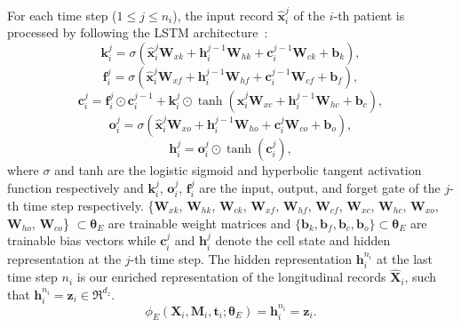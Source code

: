 For each time step ($1 \leq j \leq n_i$), the input record $\hat{\mathbf{x}}_i^j$ of the $i$-th patient is processed by following the LSTM architecture~\cite{yu2019review}:
\begin{equation}
    \mathbf{k}^j_i = \sigma(\hat{\mathbf{x}}^j_i \mathbf{W}_{xk} + \mathbf{h}_i^{j-1} \mathbf{W}_{hk} + \mathbf{c}_i^{j-1} \mathbf{W}_{ck} + \mathbf{b}_k),
\end{equation}
\begin{equation}
    \mathbf{f}^j_i = \sigma(\hat{\mathbf{x}}^j_i \mathbf{W}_{xf} + \mathbf{h}^{j-1}_i \mathbf{W}_{hf} + \mathbf{c}^{j-1}_i \mathbf{W}_{cf} + \mathbf{b}_f),
\end{equation}
\begin{equation}\label{eq: cell state}
    \mathbf{c}^j_i = \mathbf{f}^j_i \odot \mathbf{c}^{j-1}_i + \mathbf{k}^j_i \odot \operatorname{tanh}(\hat{\mathbf{x}}_i^j \mathbf{W}_{xc} + \mathbf{h}^{j - 1}_i \mathbf{W}_{hc} + \mathbf{b}_c),
\end{equation}
\begin{equation}
    \mathbf{o}^j_i = \sigma(\hat{\mathbf{x}}_i^j \mathbf{W}_{xo} + \mathbf{h}^{j-1}_i \mathbf{W}_{ho} + \mathbf{c}^j_i \mathbf{W}_{co} + \mathbf{b}_o),
\end{equation}
\begin{equation}
    \mathbf{h}^j_i = \mathbf{o}^j_i \odot \operatorname{tanh}(\mathbf{c}^j_i),
\end{equation}
where $\sigma$ and tanh are the logistic sigmoid and hyperbolic tangent activation function respectively and $\mathbf{k}^j_i$, $\mathbf{o}^j_i$, $\mathbf{f}^j_i$ are the input, output, and forget gate of the $j$-th time step respectively. \{$\mathbf{W}_{xk}$, $\mathbf{W}_{hk}$, $\mathbf{W}_{ck}$, $\mathbf{W}_{xf}$, $\mathbf{W}_{hf}$, $\mathbf{W}_{cf}$, $\mathbf{W}_{xc}$, $\mathbf{W}_{hc}$, $\mathbf{W}_{xo}$, $\mathbf{W}_{ho}$, $\mathbf{W}_{co}$\} $\subset \mathbf{\theta}_E$ are trainable weight matrices and $\{\mathbf{b}_k, \mathbf{b}_f, \mathbf{b}_c, \mathbf{b}_o\} \subset \mathbf{\theta}_E$ are trainable bias vectors while $\mathbf{c}_i^j$ and $\mathbf{h}_i^j$ denote the cell state and hidden representation at the $j$-th time step. The hidden representation $\mathbf{h}_i^{n_i}$ at the last time step $n_i$ is our enriched representation of the longitudinal records $\hat{\mathbf{X}}_i$, such that $\mathbf{h}_i^{n_i} = \mathbf{z}_i \in \Re^{d_z}$.
\begin{equation}
    \phi_E(\mathbf{X}_i, \mathbf{M}_i, \mathbf{t}_i; \mathbf{\theta}_E) = \mathbf{h}_i^{n_i} = \mathbf{z}_i.
\end{equation}
